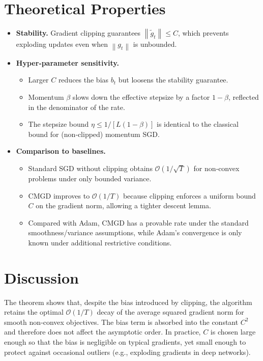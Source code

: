 \documentclass{article}
\newcommand{\norm}[1]{\left\lVert #1 \right\rVert}
\begin{document}
\section*{Theoretical Properties}
\begin{itemize}[leftmargin=*]
\item \textbf{Stability.} Gradient clipping guarantees $\norm{\tilde g_t}\le C$, which prevents exploding updates even when $\norm{g_t}$ is unbounded.
\item \textbf{Hyper‑parameter sensitivity.}
    \begin{itemize}
        \item Larger $C$ reduces the bias $b_t$ but loosens the stability guarantee.
        \item Momentum $\beta$ slows down the effective stepsize by a factor $1-\beta$, reflected in the denominator of the rate.
        \item The stepsize bound $\eta\le 1/[L(1-\beta)]$ is identical to the classical bound for (non‑clipped) momentum SGD.
    \end{itemize}
\item \textbf{Comparison to baselines.}
    \begin{itemize}
        \item Standard SGD without clipping obtains $\mathcal{O}(1/\sqrt{T})$ for non‑convex problems under only bounded variance. 
        \item CMGD improves to $\mathcal{O}(1/T)$ because clipping enforces a uniform bound $C$ on the gradient norm, allowing a tighter descent lemma.
        \item Compared with Adam, CMGD has a provable rate under the standard smoothness/variance assumptions, while Adam’s convergence is only known under additional restrictive conditions.
    \end{itemize}
\end{itemize}

\section*{Discussion}
The theorem shows that, despite the bias introduced by clipping, the algorithm retains the optimal $\mathcal{O}(1/T)$ decay of the average squared gradient norm for smooth non‑convex objectives. The bias term is absorbed into the constant $C^{2}$ and therefore does not affect the asymptotic order. In practice, $C$ is chosen large enough so that the bias is negligible on typical gradients, yet small enough to protect against occasional outliers (e.g., exploding gradients in deep networks).
\end{document}
